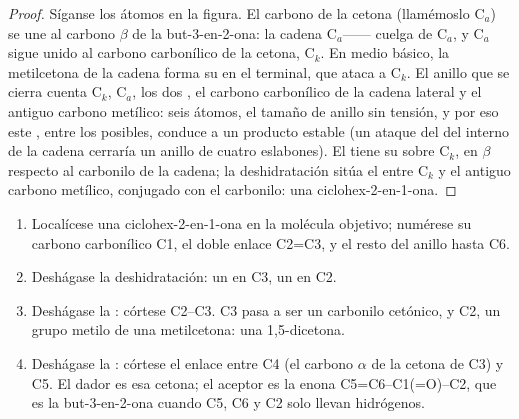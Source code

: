 \begin{proof}
Síganse los átomos en la figura. El carbono  de la cetona (llamémoslo C$_a$) se une al carbono $\beta$
de la but-3-en-2-ona: la cadena C$_a$-------- cuelga de C$_a$, y
C$_a$ sigue unido al carbono carbonílico de la cetona, C$_k$. En medio básico, la metilcetona de la cadena
forma su  en el  terminal, que ataca a C$_k$. El anillo que se cierra cuenta C$_k$, C$_a$,
los dos , el carbono carbonílico de la cadena lateral y el antiguo carbono metílico: seis átomos, el tamaño
de anillo sin tensión, y por eso este , entre los posibles, conduce a un producto estable (un
ataque del  del  interno de la cadena cerraría un anillo de cuatro eslabones). El  tiene su
 sobre C$_k$, en $\beta$ respecto al carbonilo de la cadena; la deshidratación sitúa el  entre C$_k$ y el
antiguo carbono metílico, conjugado con el carbonilo: una ciclohex-2-en-1-ona.
\end{proof}

\begin{method}\label{met:b2:conjugate-additions:robinson-disconnection}
\begin{enumerate}
  \item Localícese una ciclohex-2-en-1-ona en la molécula objetivo; numérese su carbono carbonílico C1, el doble enlace
        C2=C3, y el resto del anillo hasta C6.
  \item Deshágase la deshidratación: un  en C3, un  en C2.
  \item Deshágase la : córtese C2--C3. C3 pasa a ser un carbonilo cetónico, y C2, un grupo metilo de una
        metilcetona: una 1,5-dicetona.
  \item Deshágase la : córtese el enlace entre C4 (el carbono $\alpha$ de la cetona de C3) y
        C5. El dador es esa cetona; el aceptor es la enona C5=C6--C1(=O)--C2, que es la
        but-3-en-2-ona cuando C5, C6 y C2 solo llevan hidrógenos.
\end{enumerate}
\end{method}

